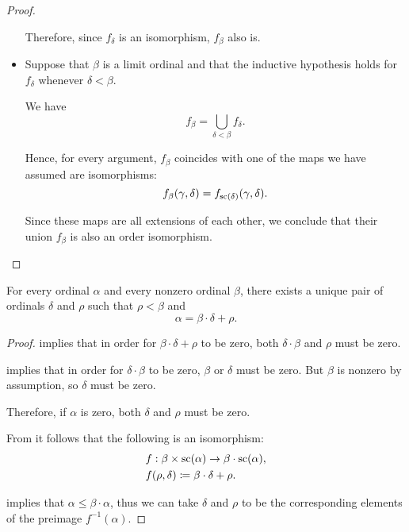 \begin{proof}
\begin{itemize}
    Therefore, since \( f_\delta \) is an isomorphism, \( f_\beta \) also is.

    \item Suppose that \( \beta \) is a limit ordinal and that the inductive hypothesis holds for \( f_\delta \) whenever \( \delta < \beta \).

    We have
    \begin{equation*}
      f_\beta = \bigcup_{\delta < \beta} f_\delta.
    \end{equation*}

    Hence, for every argument, \( f_\beta \) coincides with one of the maps we have assumed are isomorphisms:
    \begin{equation*}
      f_\beta(\gamma, \delta) = f_{\op{sc}(\delta)}(\gamma, \delta).
    \end{equation*}

    Since these maps are all extensions of each other, we conclude that their union \( f_\beta \) is also an order isomorphism.
  \end{itemize}
\end{proof}

\begin{corollary}\label{thm:ordinal_division}
  For every ordinal \( \alpha \) and every nonzero ordinal \( \beta \), there exists a unique pair of ordinals \( \delta \) and \( \rho \) such that \( \rho < \beta \) and
  \begin{equation*}
    \alpha = \beta \cdot \delta + \rho.
  \end{equation*}
\end{corollary}
\begin{proof}
    implies that in order for \( \beta \cdot \delta + \rho \) to be zero, both \( \delta \cdot \beta \) and \( \rho \) must be zero.

   implies that in order for \( \delta \cdot \beta \) to be zero, \( \beta \) or \( \delta \) must be zero. But \( \beta \) is nonzero by assumption, so \( \delta \) must be zero.

  Therefore, if \( \alpha \) is zero, both \( \delta \) and \( \rho \) must be zero.

   From  it follows that the following is an isomorphism:
  \begin{equation*}
    \begin{aligned}
      &f: \beta \times \op{sc}(\alpha) \to \beta \cdot \op{sc}(\alpha), \\
      &f(\rho, \delta) \coloneqq \beta \cdot \delta + \rho.
    \end{aligned}
  \end{equation*}

   implies that \( \alpha \leq \beta \cdot \alpha \), thus we can take \( \delta \) and \( \rho \) to be the corresponding elements of the preimage \( f^{-1}(\alpha) \).
\end{proof}

